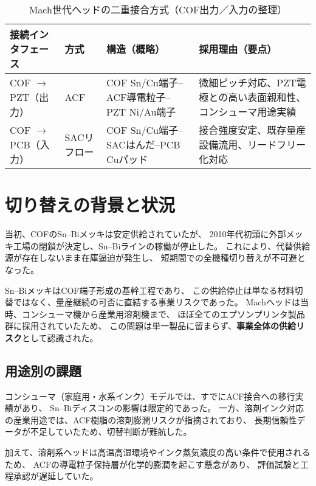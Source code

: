 \documentclass[conference]{IEEEtran}
\begin{document}
\begin{table}[t]
\centering
\footnotesize
\caption{Mach世代ヘッドの二重接合方式（COF出力／入力の整理）}
\label{tab:dual-bond}
\renewcommand{\arraystretch}{1.1}
\begin{tabularx}{\columnwidth}{@{}p{2.1cm} p{1.2cm} Y Y@{}}
\toprule
接続インタフェース & 方式 & 構造（概略） & 採用理由（要点） \\
\midrule
COF $\rightarrow$ PZT（出力） & ACF &
COF Sn/Cu端子–ACF導電粒子–PZT Ni/Au端子 &
微細ピッチ対応、PZT電極との高い表面親和性、コンシューマ用途実績 \\
\addlinespace[2pt]
COF $\rightarrow$ PCB（入力） & SACリフロー &
COF Sn/Cu端子–SACはんだ–PCB Cuパッド &
接合強度安定、既存量産設備流用、リードフリー化対応 \\
\bottomrule
\end{tabularx}
\end{table}

\section{切り替えの背景と状況}

当初、COFのSn–Biメッキは安定供給されていたが、  
2010年代初頭に外部メッキ工場の閉鎖が決定し、Sn–Biラインの稼働が停止した。  
これにより、代替供給源が存在しないまま在庫逼迫が発生し、  
短期間での全機種切り替えが不可避となった。  

Sn–BiメッキはCOF端子形成の基幹工程であり、  
この供給停止は単なる材料切替ではなく、量産継続の可否に直結する事業リスクであった。  
Machヘッドは当時、コンシューマ機から産業用溶剤機まで、  
ほぼ全てのエプソンプリンタ製品群に採用されていたため、  
この問題は単一製品に留まらず、\textbf{事業全体の供給リスク}として認識された。  

\subsection{用途別の課題}
コンシューマ（家庭用・水系インク）モデルでは、すでにACF接合への移行実績があり、  
Sn–Biディスコンの影響は限定的であった。  
一方、溶剤インク対応の産業用途では、ACF樹脂の溶剤膨潤リスクが指摘されており、  
長期信頼性データが不足していたため、切替判断が難航した。  

加えて、溶剤系ヘッドは高温高湿環境やインク蒸気濃度の高い条件で使用されるため、  
ACFの導電粒子保持層が化学的膨潤を起こす懸念があり、  
評価試験と工程承認が遅延していた。
\end{document}
